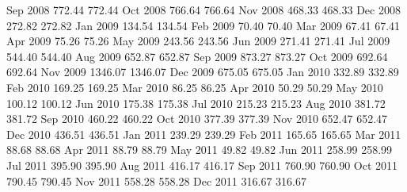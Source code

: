 \begin{center}
\begin{Schunk}
\begin{Soutput}
Sep 2008  772.44  772.44
Oct 2008  766.64  766.64
Nov 2008  468.33  468.33
Dec 2008  272.82  272.82
Jan 2009  134.54  134.54
Feb 2009   70.40   70.40
Mar 2009   67.41   67.41
Apr 2009   75.26   75.26
May 2009  243.56  243.56
Jun 2009  271.41  271.41
Jul 2009  544.40  544.40
Aug 2009  652.87  652.87
Sep 2009  873.27  873.27
Oct 2009  692.64  692.64
Nov 2009 1346.07 1346.07
Dec 2009  675.05  675.05
Jan 2010  332.89  332.89
Feb 2010  169.25  169.25
Mar 2010   86.25   86.25
Apr 2010   50.29   50.29
May 2010  100.12  100.12
Jun 2010  175.38  175.38
Jul 2010  215.23  215.23
Aug 2010  381.72  381.72
Sep 2010  460.22  460.22
Oct 2010  377.39  377.39
Nov 2010  652.47  652.47
Dec 2010  436.51  436.51
Jan 2011  239.29  239.29
Feb 2011  165.65  165.65
Mar 2011   88.68   88.68
Apr 2011   88.79   88.79
May 2011   49.82   49.82
Jun 2011  258.99  258.99
Jul 2011  395.90  395.90
Aug 2011  416.17  416.17
Sep 2011  760.90  760.90
Oct 2011  790.45  790.45
Nov 2011  558.28  558.28
Dec 2011  316.67  316.67
\end{Soutput}
\end{Schunk}

\end{center}
